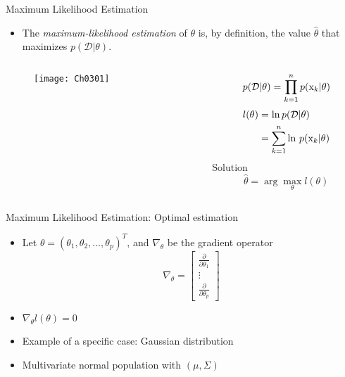 \begin{frame}{{Maximum Likelihood Estimation}}
\begin{itemize}
\item The \textit{\color{mycolor1}maximum-likelihood estimation} of $\theta$ is, by definition, the value $\hat{\theta}$ that maximizes $p(\mathcal{D}|\theta)$.
\end{itemize}
\vspace{-12pt}
\begin{columns}
\begin{column}{6cm}
\vspace{-12pt}
\begin{figure}
\texttt{[image: Ch0301]}
\end{figure}
\end{column}
\begin{column}{5cm}
\begin{equation}
p(\mathcal{D}| \theta ) = \prod\limits_{k = 1}^n {p({{\rm x}_k}|\theta )}\nonumber
\end{equation}
\begin{align}
l(\theta)&=\ln p(\mathcal{D}|\theta)\nonumber\\
&=\sum\limits_{k = 1}^n {{\mathop{\rm \ln } \nolimits}~p({{\rm x}_k}|\theta )}\nonumber
\end{align}
{\color{mycolor2}Solution}\\
\begin{equation}
\hat \theta  = \arg \mathop {\max }\limits_\theta  l(\theta )\nonumber
\end{equation}
\end{column}
\end{columns}
\end{frame}

\begin{frame}{Maximum Likelihood Estimation: Optimal estimation}
\begin{itemize}
\item Let $\theta=(\theta_1,\theta_2,\ldots,\theta_p)^T$, and $\nabla_{\theta}$ be the gradient operator
\begin{equation}
{\nabla _\theta } = \left[ {\begin{array}{*{20}{c}}
{\frac{\partial }{{\partial {\theta _1}}}}\\
 \vdots \\
{\frac{\partial }{{\partial {\theta _p}}}}
\end{array}} \right]\nonumber
\end{equation}
\item $\nabla_{\theta}l(\theta)=0$
\item {\color{mycolor1}Example of a specific case}: Gaussian distribution
\item Multivariate normal population with $(\mu,\Sigma)$
\end{itemize}
\end{frame}

